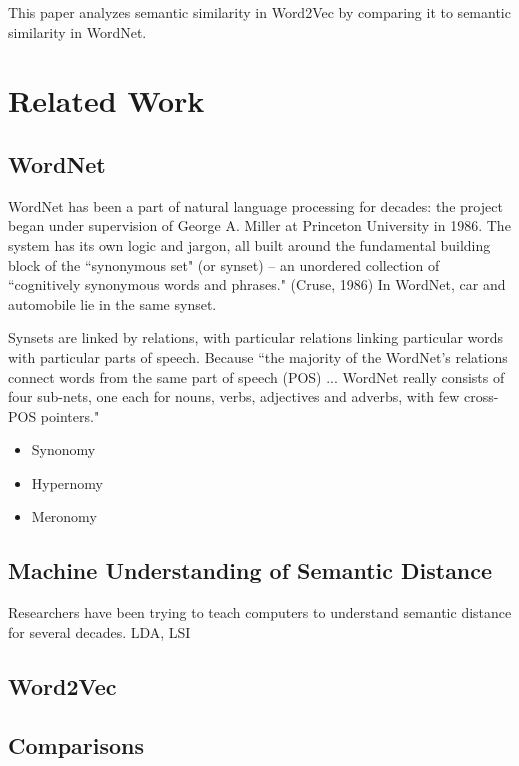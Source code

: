 \documentclass{article}
\begin{document}
This paper analyzes semantic similarity in Word2Vec by comparing it to semantic similarity in WordNet. 

\section{Related Work}

\subsection{WordNet}
WordNet has been a part of natural language processing for decades: the project began under supervision of George A. Miller at Princeton University in 1986. The system has its own logic and jargon, all built around the fundamental building block of the ``synonymous set" (or synset) \cite{wordnet} -- an unordered collection of ``cognitively synonymous words and phrases." (Cruse, 1986) In WordNet, car and automobile lie in the same synset.

Synsets are linked by relations, with particular relations linking particular words with particular parts of speech. Because ``the majority of the WordNet’s relations connect words from the same part of speech (POS) ... WordNet really consists of four sub-nets, one each for nouns, verbs, adjectives and adverbs, with few cross-POS pointers." \cite{Wordnetwebsite}

\begin{itemize}

  \item Synonomy
  \item Hypernomy
  \item Meronomy

\end{itemize}

\subsection{Machine Understanding of Semantic Distance}
Researchers have been trying to teach computers to understand semantic distance for several decades. LDA, LSI

\subsection{Word2Vec}

\subsection{Comparisons}
\end{document}
